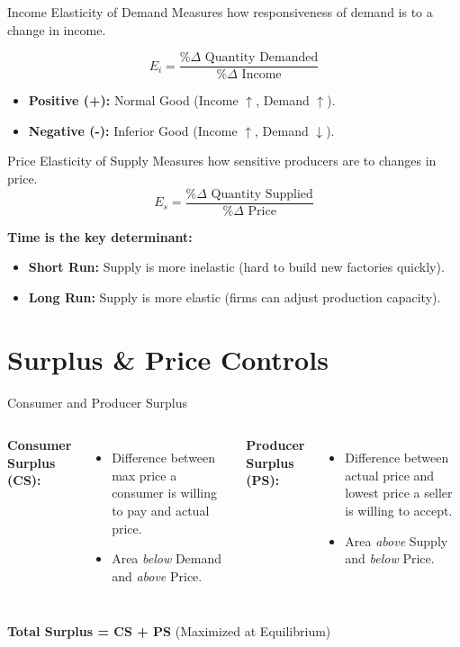 \documentclass[aspectratio=169]{beamer}
\begin{document}
\begin{frame}{Income Elasticity of Demand}
    Measures how responsiveness of demand is to a change in income.
    
    \[ E_i = \frac{\% \Delta \text{ Quantity Demanded}}{\% \Delta \text{ Income}} \]
    
    \begin{itemize}
        \item \textbf{Positive (+):} Normal Good (Income $\uparrow$, Demand $\uparrow$).
        \item \textbf{Negative (-):} Inferior Good (Income $\uparrow$, Demand $\downarrow$).
    \end{itemize}
\end{frame}

\begin{frame}{Price Elasticity of Supply}
    Measures how sensitive producers are to changes in price.
    \[ E_s = \frac{\% \Delta \text{ Quantity Supplied}}{\% \Delta \text{ Price}} \]
    
    \textbf{Time is the key determinant:}
    \begin{itemize}
        \item \textbf{Short Run:} Supply is more inelastic (hard to build new factories quickly).
        \item \textbf{Long Run:} Supply is more elastic (firms can adjust production capacity).
    \end{itemize}
\end{frame}

\section{Surplus \& Price Controls}

\begin{frame}{Consumer and Producer Surplus}
    \begin{columns}
        \textbf{Consumer Surplus (CS):}
        \begin{itemize}
            \item Difference between max price a consumer is willing to pay and actual price.
            \item Area \textit{below} Demand and \textit{above} Price.
        \end{itemize}
        
        \textbf{Producer Surplus (PS):}
        \begin{itemize}
            \item Difference between actual price and lowest price a seller is willing to accept.
            \item Area \textit{above} Supply and \textit{below} Price.
        \end{itemize}
    \end{columns}
    \vspace{0.5cm}
    \centering
    \textbf{Total Surplus = CS + PS} (Maximized at Equilibrium)
\end{frame}
\end{document}

